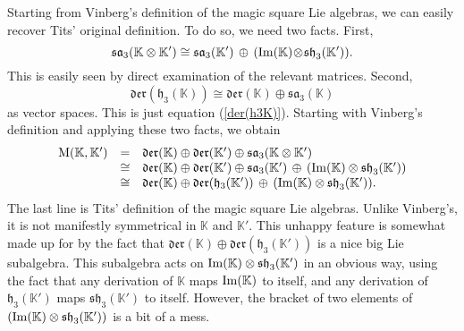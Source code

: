 \documentclass[12pt]{article}
\newcommand\K{{\mathbb K}}
\newcommand{\M}{{\rm M}}
\newcommand{\sa}{{\mathfrak {sa}}}
\newcommand{\h}{{\mathfrak {h}}}
\newcommand{\sh}{{\mathfrak {sh}}}
\newcommand{\Der}{{\mathfrak {der}}}
\renewcommand{\Im}{{\rm Im}}
\newcommand{\tensor}{\otimes}
\newcommand{\iso}{\cong}
\begin{document}
Starting from Vinberg's definition of the magic square Lie algebras, we
can easily recover Tits' original definition.  To do so, we need two
facts.  First, 
\[  
\sa_3(\K \otimes \K') 
\iso \sa_3(\K') \, \oplus \, (\Im(\K) \! \tensor \! \sh_3(\K')).
\]
This is easily seen by direct examination of the relevant matrices.
Second, 
\[    \Der(\h_3(\K)) \iso \Der(\K) \oplus \sa_3(\K)  \]
as vector spaces.  This is just equation (\ref{der(h3K)}).  Starting with
Vinberg's definition and applying these two facts, we obtain
\[
\begin{array}{lcl}
\M(\K,\K') &=& \Der(\K) \oplus \Der(\K') \oplus \sa_3(\K \tensor \K') \\
&\iso& \Der(\K) \oplus \Der(\K') 
\oplus \sa_3(\K') \, \oplus \, (\Im(\K) \tensor \sh_3(\K')) \\
&\iso& 
\Der(\K) \oplus \Der(\h_3(\K')) \, \oplus \, (\Im(\K) \tensor \sh_3(\K')) .
\end{array}
\]
The last line is Tits' definition of the magic square Lie algebras.
Unlike Vinberg's, it is not manifestly symmetrical in $\K$ and $\K'$.
This unhappy feature is somewhat made up for by the fact that $\Der(\K)
\oplus \Der(\h_3(\K'))$ is a nice big Lie subalgebra.  This subalgebra
acts on $\Im(\K) \tensor \sh_3(\K')$ in an obvious way, using the fact
that any derivation of $\K$ maps $\Im(\K)$ to itself, and any derivation
of $\h_3(\K')$ maps $\sh_3(\K')$ to itself.  However, the bracket of two
elements of $(\Im(\K) \tensor \sh_3(\K'))$ is a bit of a mess.
\end{document}
